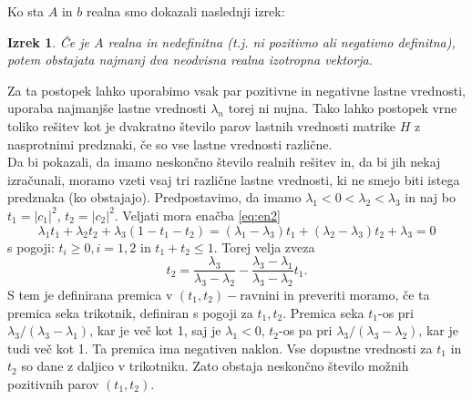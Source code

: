\documentclass[12pt,a4paper]{amsart}
\theoremstyle{definition}
\theoremstyle{plain}
\newtheorem{izrek}[definicija]{Izrek}
\newcommand{\abs}[1]{ \left\lvert#1\right\rvert}
\begin{document}
Ko sta $A$ in $b$ realna smo dokazali naslednji izrek:
\begin{izrek}\cite{meurant}
Če je $A$ realna in nedefinitna (t.j. ni pozitivno ali negativno definitna), potem obstajata najmanj dva neodvisna realna izotropna vektorja. 
\end{izrek}
Za ta postopek lahko uporabimo vsak par pozitivne in negativne lastne vrednosti, uporaba najmanjše lastne vrednosti $\lambda_n$ torej ni nujna. Tako lahko postopek vrne toliko rešitev kot je dvakratno število parov lastnih vrednosti matrike $H$ z nasprotnimi predznaki, če so vse lastne vrednosti različne.\\
Da bi pokazali, da imamo neskončno število realnih rešitev in, da bi jih nekaj izračunali, moramo vzeti vsaj tri različne lastne vrednosti, ki ne smejo biti istega predznaka (ko obstajajo). Predpostavimo, da imamo $\lambda_1 <0<\lambda_2<\lambda_3$ in naj bo $t_1=\abs{c_1}^2$, $t_2=\abs{c_2}^2$. Veljati mora enačba \eqref{eq:en2}
\begin{equation}\label{trije}
\lambda_1 t_1 +\lambda_2 t_2 +\lambda_3 (1- t_1 -t_2)=(\lambda_1 -\lambda_3)t_1 +(\lambda_2 -\lambda_3)t_2 +\lambda_3=0
\end{equation}
s pogoji: $t_i \ge 0, i=1,2$ in $t_1 +t_2\le1$. Torej velja zveza $$t_2=\frac{\lambda_3}{\lambda_3 - \lambda_2} -\frac{\lambda_3 -\lambda_1}{\lambda_3 -\lambda_2}t_1.$$
S tem je definirana premica v $(t_1,t_2)-\text{ravnini}$ in preveriti moramo, če ta premica seka trikotnik, definiran s pogoji za $t_1,t_2$. Premica seka $t_1$-os pri $\lambda_3 /(\lambda_3 -\lambda_1)$, kar je več kot 1, saj je $\lambda_1 <0$, $t_2$-os pa pri $\lambda_3 /(\lambda_3 - \lambda_2)$, kar je tudi več kot 1. Ta premica ima negativen naklon. Vse dopustne vrednosti za $t_1$ in $t_2$ so dane z daljico v trikotniku. Zato obstaja neskončno število možnih pozitivnih parov $(t_1,t_2)$.
\end{document}
